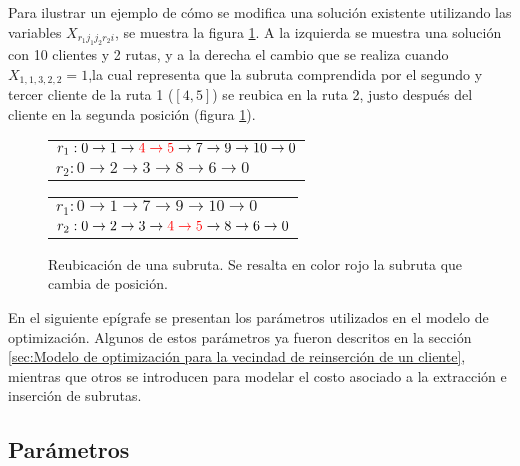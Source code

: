 \documentclass[12pt]{report}
\begin{document}
	Para ilustrar un ejemplo de cómo se modifica una solución existente utilizando las variables $X_{r_1j_1j_2r_2i}$, se muestra la figura \ref{variable-2}. A la izquierda se muestra una solución con 10 clientes y 2 rutas, y a la derecha el cambio que se realiza cuando $X_{1,1,3,2,2}=1$,la cual representa que la subruta comprendida por el segundo y tercer cliente de la ruta 1 (\([4,5]\)) se reubica en la ruta 2, justo después del cliente en la segunda posición (figura \ref{variable-2}).

		\begin{figure}[h!]
			\centering
			\begin{minipage}{0.45\textwidth}
				\begin{tabular}{l}
					$r_1:  0 \rightarrow 1\rightarrow \textcolor{red}{4 \rightarrow 5} \rightarrow 7 \rightarrow 9 \rightarrow 10 \rightarrow  0$\\
					$r_2:  0\rightarrow 2\rightarrow 3\rightarrow 8 \rightarrow 6 \rightarrow  0$\\
				\end{tabular}
			\end{minipage}
			\hfill
			\begin{minipage}{0.45\textwidth}
				\begin{tabular}{l}
					$r_1:  0 \rightarrow 1 \rightarrow 7 \rightarrow 9 \rightarrow 10 \rightarrow 0$\\
					$r_2:  0\rightarrow 2\rightarrow 3 \rightarrow \textcolor{red}{4 \rightarrow 5}\rightarrow 8 \rightarrow 6 \rightarrow 0$\\
				\end{tabular}
			\end{minipage}

			\caption{Reubicación de una subruta. Se resalta en color rojo la subruta que cambia de posición.}
			\label{variable-2}
		\end{figure}


	En el siguiente epígrafe se presentan los parámetros utilizados en el modelo de optimización. Algunos de estos parámetros ya fueron descritos en la sección \ref{sec:Modelo de optimización para la vecindad de reinserción de un cliente}, mientras que otros se introducen para modelar el costo asociado a la extracción e inserción de subrutas.

	\subsection{Parámetros}
\end{document}

